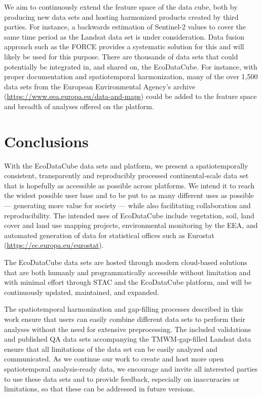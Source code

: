 We aim to continuously extend the feature space of the data cube, both by producing new data sets and hosting harmonized products created by third parties. For instance, a backwards estimation of Sentinel-2 values to cover the same time period as the Landsat data set is under consideration. Data fusion approach such as the FORCE \citep{frantz2019force} provides a systematic solution for this and will likely be used for this purpose. There are thousands of data sets that could potentially be integrated in, and shared on, the EcoDataCube. For instance, with proper documentation and spatiotemporal harmonization, many of the over 1,500 data sets from the European Environmental Agency's archive (\url{https://www.eea.europa.eu/data-and-maps}) could be added to the feature space and breadth of analyses offered on the platform.


\section*{Conclusions}
With the EcoDataCube data sets and platform, we present a spatiotemporally consistent, transparently and reproducibly processed continental-scale data set that is hopefully as accessible as possible across platforms. We intend it to reach the widest possible user base and to be put to as many different uses as possible --- generating more value for society --- while also facilitating collaboration and reproducibility. The intended uses of EcoDataCube include vegetation, soil, land cover and land use mapping projects, environmental monitoring by the EEA, and automated generation of data for statistical offices such as Eurostat (\url{https://ec.europa.eu/eurostat}).  
    
The EcoDataCube data sets are hosted through modern cloud-based solutions that are both humanly and programmatically accessible without limitation and with minimal effort through STAC and the EcoDataCube platform, and will be continuously updated, maintained, and expanded.

The spatiotemporal harmonization and gap-filling processes described in this work ensure that users can easily combine different data sets to perform their analyses without the need for extensive preprocessing. The included validations and published QA data sets accompanying the TMWM-gap-filled Landsat data ensure that all limitations of the data set can be easily analyzed and communicated. As we continue our work to create and host more open spatiotemporal analysis-ready data, we encourage and invite all interested parties to use these data sets and to provide feedback, especially on inaccuracies or limitations, so that these can be addressed in future versions. 

